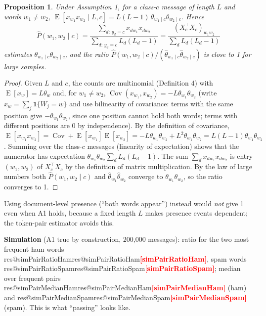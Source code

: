 \documentclass[11pt]{article}
\makeatletter
\newcommand{\fillin}[1]{\textcolor{red}{\textbf{[#1]}}}
\newcommand{\res}[1]{\ifcsname res@#1\endcsname\csname res@#1\endcsname\else\fillin{#1}\fi}
\theoremstyle{plain}
\newtheorem{proposition}[theorem]{Proposition}
\DeclareMathOperator{\E}{E}
\DeclareMathOperator{\Cov}{Cov}
\makeatother
\begin{document}
\begin{proposition}\label{prop:pairs}
Under Assumption 1, for a class-$c$ message of length $L$ and words $w_1\neq w_2$,
$\E[x_{w_1}x_{w_2}\mid L,c]=L(L-1)\,\theta_{w_1\mid c}\theta_{w_2\mid c}$. Hence
\[
\hat P(w_1,w_2\mid c)=\frac{\sum_{d:\,y_d=c}x_{dw_1}x_{dw_2}}{\sum_{d:\,y_d=c}L_d(L_d-1)}
=\frac{(X_c^\top X_c)_{w_1w_2}}{\sum_dL_d(L_d-1)}
\]
estimates $\theta_{w_1\mid c}\theta_{w_2\mid c}$, and the ratio
$\hat P(w_1,w_2\mid c)/(\hat\theta_{w_1\mid c}\hat\theta_{w_2\mid c})$ is close to 1 for large samples.
\end{proposition}
\begin{proof}
Given $L$ and $c$, the counts are multinomial (Definition 4) with $\E[x_w]=L\theta_w$ and, for
$w_1\ne w_2$, $\Cov(x_{w_1},x_{w_2})=-L\theta_{w_1}\theta_{w_2}$ (write $x_w=\sum_j\mathbf 1\{W_j=w\}$ and use
bilinearity of covariance: terms with the same position give $-\theta_{w_1}\theta_{w_2}$, since one
position cannot hold both words; terms with different positions are 0 by independence). By the
definition of covariance,
$\E[x_{w_1}x_{w_2}]=\Cov+\E[x_{w_1}]\E[x_{w_2}]=-L\theta_{w_1}\theta_{w_2}+L^2\theta_{w_1}\theta_{w_2}=L(L-1)\theta_{w_1}\theta_{w_2}$.
Summing over the class-$c$ messages (linearity of expectation) shows that the numerator has
expectation $\theta_{w_1}\theta_{w_2}\sum_dL_d(L_d-1)$. The sum $\sum_d x_{dw_1}x_{dw_2}$ is entry
$(w_1,w_2)$ of $X_c^\top X_c$ by the definition of matrix multiplication. By the law of large
numbers both $\hat P(w_1,w_2\mid c)$ and $\hat\theta_{w_1}\hat\theta_{w_2}$ converge to
$\theta_{w_1}\theta_{w_2}$, so the ratio converges to 1.
\end{proof}
Using document-level presence (``both words appear'') instead would \emph{not} give 1 even when A1
holds, because a fixed length $L$ makes presence events dependent; the token-pair estimator avoids this.

\textbf{Simulation} (A1 true by construction, 200{,}000 messages): ratio for the two most frequent
ham words \res{simPairRatioHam}, spam words \res{simPairRatioSpam}; median over frequent pairs
\res{simPairMedianHam} (ham) and \res{simPairMedianSpam} (spam). This is what ``passing'' looks like.
\end{document}
